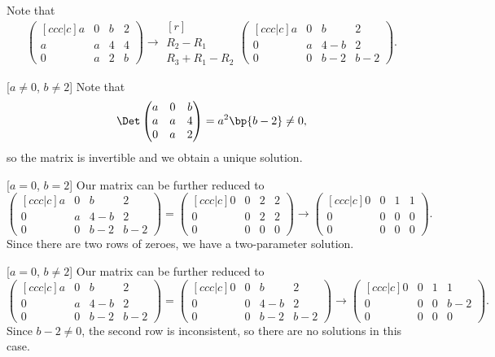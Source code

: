 \begin{solution}
    Note that \[\begin{pmatrix}[ccc|c] a & 0 & b & 2 \\ a & a & 4 & 4 \\ 0 & a & 2 & b\end{pmatrix} \rightarrow \begin{matrix}[r] \\ \scriptstyle R_2 - R_1 \\ \scriptstyle R_3 + R_1 - R_2\end{matrix} \begin{pmatrix}[ccc|c]a & 0 & b & 2 \\ 0 & a & 4-b & 2 \\ 0 & 0 & b-2 & b-2\end{pmatrix}.\]
    
    [$a \neq 0$, $b \neq 2$] Note that \[\Det \begin{pmatrix} a & 0 & b \\ a & a & 4 \\ 0 & a & 2 \end{pmatrix} = a^2 \bp{b-2} \neq 0,\] so the matrix is invertible and we obtain a unique solution.

    [$a = 0$, $b = 2$] Our matrix can be further reduced to \[\begin{pmatrix}[ccc|c]a & 0 & b & 2 \\ 0 & a & 4-b & 2 \\ 0 & 0 & b-2 & b-2\end{pmatrix} = \begin{pmatrix}[ccc|c]0 & 0 & 2 & 2 \\ 0 & 0 & 2 & 2 \\ 0 & 0 & 0 & 0\end{pmatrix} \rightarrow \begin{pmatrix}[ccc|c]0 & 0 & 1 & 1 \\ 0 & 0 & 0 & 0 \\ 0 & 0 & 0 & 0\end{pmatrix}.\] Since there are two rows of zeroes, we have a two-parameter solution.

    [$a = 0$, $b \neq 2$] Our matrix can be further reduced to \[\begin{pmatrix}[ccc|c]a & 0 & b & 2 \\ 0 & a & 4-b & 2 \\ 0 & 0 & b-2 & b-2\end{pmatrix} = \begin{pmatrix}[ccc|c]0 & 0 & b & 2 \\ 0 & 0 & 4-b & 2 \\ 0 & 0 & b-2 & b-2\end{pmatrix} \rightarrow \begin{pmatrix}[ccc|c]0 & 0 & 1 & 1 \\ 0 & 0 & 0 & b-2 \\ 0 & 0 & 0 & 0\end{pmatrix}.\] Since $b - 2 \neq 0$, the second row is inconsistent, so there are no solutions in this case.


\end{solution}

